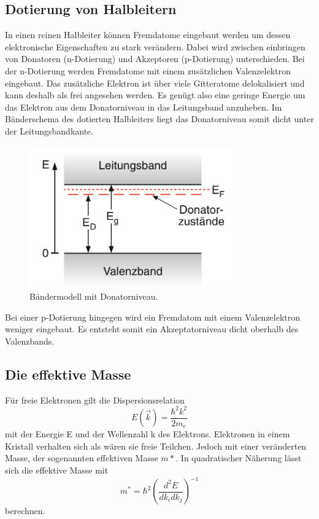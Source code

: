 \subsection{Dotierung von Halbleitern}
In einen reinen Halbleiter können Fremdatome eingebaut werden um dessen elektronische Eigenschaften zu stark verändern.
Dabei wird zwischen einbringen von Donatoren (n-Dotierung) und Akzeptoren (p-Dotierung) unterschieden.
Bei der n-Dotierung werden Fremdatome mit einem zusätzlichen Valenzelektron eingebaut. Das zusätzliche Elektron ist über viele Gitteratome delokalisiert
und kann deshalb als frei angesehen werden. Es genügt also eine geringe Energie um das Elektron aus dem Donatorniveau in das Leitungsband anzuheben. 
Im Bänderschema des dotierten Halbleiters liegt das Donatorniveau somit dicht unter der Leitungsbandkante.
\begin{figure}
    \centering
    \includegraphics[width = 0.78\textwidth]{pics/n_dotierung.png}
    \caption{Bändermodell mit Donatorniveau.\cite{Demtröder3}}
    \label{pic:ndotierung}
\end{figure}
Bei einer p-Dotierung hingegen wird ein Fremdatom mit einem Valenzelektron weniger eingebaut. Es entsteht somit ein Akzeptatorniveau dicht oberhalb
des Valenzbands.

\subsection{Die effektive Masse}
Für freie Elektronen gilt die Dispersionsrelation
\begin{equation}
    E(\vec{k}) = \frac{\hbar^2 k^2}{2 m_e}
    \label{eqn:frei}
\end{equation}
mit der Energie E und der Wellenzahl k des Elektrons. Elektronen in einem Kristall verhalten sich als wären sie freie Teilchen. Jedoch mit einer veränderten Masse,
der sogenannten effektiven Masse $m*$. In quadratischer Näherung lässt sich die effektive Masse mit
\begin{equation}
    m^* = \hbar^2 \left(\frac{d^2 E}{d k_i d k_j}\right)^{-1}
\end{equation}
berechnen. 
 
